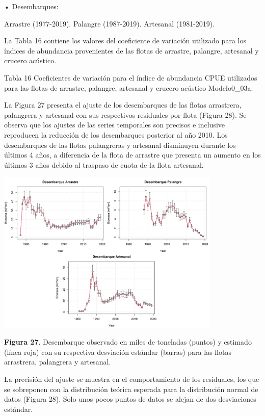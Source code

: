 \documentclass[
  spanish,
]{article}
\begin{document}
• Desembarques:

Arrastre (1977-2019). Palangre (1987-2019). Artesanal (1981-2019).

La Tabla 16 contiene los valores del coeficiente de variación utilizado
para los índices de abundancia provenientes de las flotas de arrastre,
palangre, artesanal y crucero acústico.

Tabla 16 Coeficientes de variación para el índice de abundancia CPUE
utilizados para las flotas de arrastre, palangre, artesanal y crucero
acústico Modelo0\_03a.

La Figura 27 presenta el ajuste de los desembarques de las flotas
arrastrera, palangrera y artesanal con sus respectivos residuales por
flota (Figura 28). Se observa que los ajustes de las series temporales
son precisos e inclusive reproducen la reducción de los desembarques
posterior al año 2010. Los desembarques de las flotas palangreras y
artesanal disminuyen durante los últimos 4 años, a diferencia de la
flota de arrastre que presenta un aumento en los últimos 3 años debido
al traspaso de cuota de la flota artesanal.

\begin{center}
\includegraphics[width=0.8\textwidth]{Figuras/FitY.png}
\end{center}

\small \textbf{Figura 27}. Desembarque observado en miles de toneladas
(puntos) y estimado (línea roja) con su respectiva desviación estándar
(barras) para las flotas arrastrera, palangrera y artesanal.
\vspace{0.5cm} \normalsize

La precisión del ajuste se muestra en el comportamiento de los
residuales, los que se sobreponen con la distribución teórica esperada
para la distribución normal de datos (Figura 28). Solo unos pocos puntos
de datos se alejan de dos desviaciones estándar.
\end{document}
